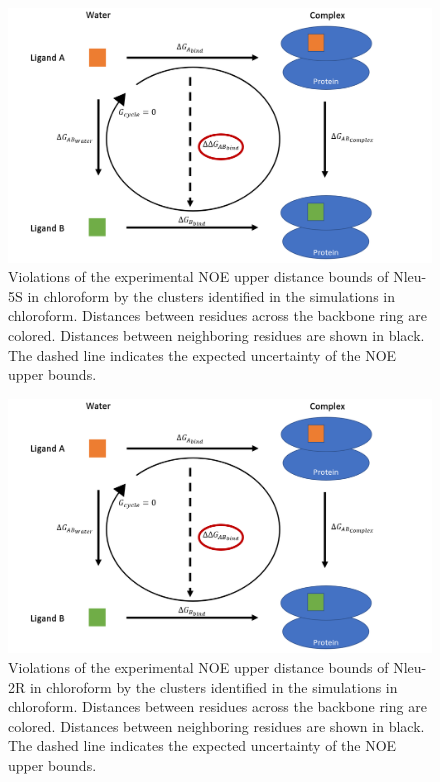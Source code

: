 \begin{figure}
    \centering
    \includegraphics[width=\textwidth]{fig/dummy.png}
    \caption{ Violations  of  the  experimental  NOE  upper  distance  bounds  of  Nleu-5S  in chloroform by the clusters identified in the simulations in chloroform. Distances             between residues across the backbone ring are colored. Distances between neighboring residues are shown in black. The dashed line indicates the expected uncertainty of          the NOE upper bounds.}
    \label{fig: SINOE violations Nleu-5S}
\end{figure}

\begin{figure}
    \centering
    \includegraphics[width=\textwidth]{fig/dummy.png}
    \caption{Violations  of  the  experimental  NOE  upper  distance  bounds  of  Nleu-2R  in chloroform by the clusters identified in the simulations in chloroform. Distances              between residues across the backbone ring are colored. Distances between neighboring residues are shown in black. The dashed line indicates the expected uncertainty of          the NOE upper bounds.}
    \label{fig: SINOE violations Nleu-2R}
\end{figure}

